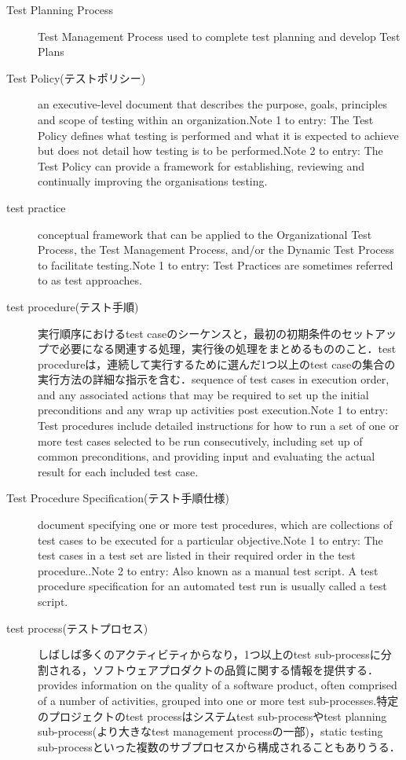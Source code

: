 \begin{description}
    \item[Test Planning Process]Test Management Process used to complete test planning and develop Test Plans
    \item[Test Policy(テストポリシー)]an executive-level document that describes the purpose, goals, principles and scope of testing within an organization.Note 1 to entry: The Test Policy defines what testing is performed and what it is expected to achieve but does not detail how testing is to be performed.Note 2 to entry: The Test Policy can provide a framework for establishing, reviewing and continually improving the organisations testing.
    \item[test practice]conceptual framework that can be applied to the Organizational Test Process, the Test Management Process, and/or the Dynamic Test Process to facilitate testing.Note 1 to entry: Test Practices are sometimes referred to as test approaches.
    \item[test procedure(テスト手順)]実行順序におけるtest caseのシーケンスと，最初の初期条件のセットアップで必要になる関連する処理，実行後の処理をまとめるもののこと．test procedureは，連続して実行するために選んだ1つ以上のtest caseの集合の実行方法の詳細な指示を含む．sequence of test cases in execution order, and any associated actions that may be required to set up the initial preconditions and any wrap up activities post execution.Note 1 to entry: Test procedures include detailed instructions for how to run a set of one or more test cases selected to be run consecutively, including set up of common preconditions, and providing input and evaluating the actual result for each included test case.
    \item[Test Procedure Specification(テスト手順仕様)]document specifying one or more test procedures, which are collections of test cases to be executed for a particular objective.Note 1 to entry: The test cases in a test set are listed in their required order in the test procedure..Note 2 to entry: Also known as a manual test script. A test procedure specification for an automated test run is usually called a test script.
    \item[test process(テストプロセス)]しばしば多くのアクティビティからなり，1つ以上のtest sub-processに分割される，ソフトウェアプロダクトの品質に関する情報を提供する．provides information on the quality of a software product, often comprised of a number of activities, grouped into one or more test sub-processes.特定のプロジェクトのtest processはシステムtest sub-processやtest planning sub-process(より大きなtest management processの一部)，static testing sub-processといった複数のサブプロセスから構成されることもありうる．

\end{description}
